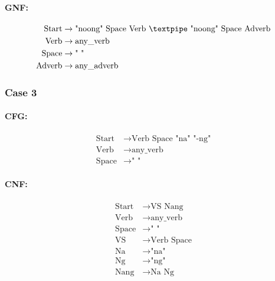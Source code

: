 \paragraph{GNF:}

\begin{equation*}
    \begin{aligned}
        \text{Start} &\rightarrow \text{"noong" Space Verb {\textpipe} "noong" Space Adverb} \\
        \text{Verb} &\rightarrow \text{any\_verb} \\
        \text{Space} &\rightarrow \text{" "} \\
        \text{Adverb} &\rightarrow \text{any\_adverb}
    \end{aligned}
\end{equation*}


\subsubsection{Case 3}

\paragraph{CFG:}

\begin{equation*}
    \begin{aligned}
        \text{Start} &\rightarrow \text{Verb Space "na" "-ng"} \\
        \text{Verb} &\rightarrow \text{any\_verb} \\
        \text{Space} &\rightarrow \text{" "}
    \end{aligned}
\end{equation*}

\paragraph{CNF:}

\begin{equation*}
    \begin{aligned}
        \text{Start} &\rightarrow \text{VS Nang} \\
        \text{Verb} &\rightarrow \text{any\_verb} \\
        \text{Space} &\rightarrow \text{" "} \\
        \text{VS} &\rightarrow \text{Verb Space} \\
        \text{Na} &\rightarrow \text{"na"} \\
        \text{Ng} &\rightarrow \text{"ng"} \\
        \text{Nang} &\rightarrow \text{Na Ng}
    \end{aligned}
\end{equation*}

